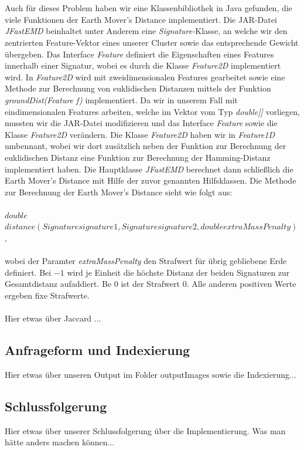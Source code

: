 \documentclass{scrartcl}
\begin{document}
\\
\\
Auch für dieses Problem haben wir eine Klassenbibliothek in Java gefunden, die viele Funktionen der Earth Mover's Distance implementiert. Die JAR-Datei \textit{JFastEMD} beinhaltet unter Anderem eine \textit{Signature-}Klasse, an welche wir den zentrierten Feature-Vektor eines unserer Cluster sowie das entsprechende Gewicht übergeben. Das Interface \textit{Feature} definiert die Eigenschaften eines Features innerhalb einer Signatur, wobei es durch die Klasse \textit{Feature2D} implementiert wird. In \textit{Feature2D} wird mit zweidimensionalen Features gearbeitet sowie eine Methode zur Berechnung von euklidischen Distanzen mittels der Funktion \textit{groundDist(Feature f)} implementiert. Da wir in unserem Fall mit eindimensionalen Features arbeiten, welche im Vektor vom Typ \textit{double[]} vorliegen, mussten wir die JAR-Datei modifizieren und das Interface \textit{Feature} sowie die Klasse \textit{Feature2D} verändern. Die Klasse \textit{Feature2D} haben wir in \textit{Feature1D} umbennant, wobei wir dort zusätzlich neben der Funktion zur Berechnung der euklidischen Distanz eine Funktion zur Berechnung der Hamming-Distanz implementiert haben. Die Hauptklasse \textit{JFastEMD} berechnet dann schließlich die Earth Mover's Distance mit Hilfe der zuvor genannten Hilfsklassen. Die Methode zur Berechnung der Earth Mover's Distance sieht wie folgt aus:
\\
\\
$double$ $distance(Signature signature1, Signature signature2, double extraMassPenalty)$,
\\
\\
wobei der Paramter \textit{extraMassPenalty} den Strafwert für übrig gebliebene Erde definiert. Bei $-1$ wird je Einheit die höchste Distanz der beiden Signaturen zur Gesamtdistanz aufaddiert. Be $0$ ist der Strafwert $0$. Alle anderen positiven Werte ergeben fixe Strafwerte.
\\
\\
Hier etwas über Jaccard ... 

\subsection{Anfrageform und Indexierung}
Hier etwas über unseren Output im Folder outputImages sowie die Indexierung...

\subsection{Schlussfolgerung}
Hier etwas über unserer Schlussfolgerung über die Implementierung. Was man hätte anders machen können...
\end{document}
